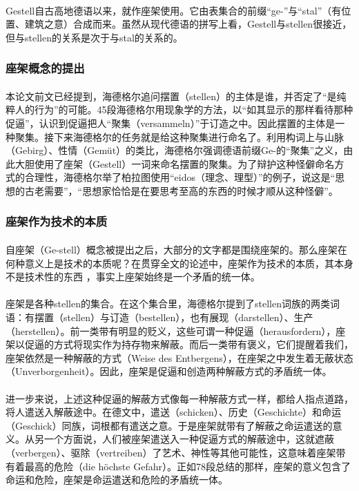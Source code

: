 \documentclass{article}
\begin{document}
		\paragraph{}
		Gestell自古高地德语以来，就作座架使用。它由表集合的前缀“ge-”与“stal”（有位置、建筑之意）合成而来。虽然从现代德语的拼写上看，Gestell与stellen很接近，但与stellen的关系是次于与stal的关系的。
		\subsubsection{座架概念的提出}
		\paragraph{}
		本论文前文已经提到，海德格尔追问摆置（stellen）的主体是谁，并否定了“是纯粹人的行为”的可能。45段海德格尔用现象学的方法，以“如其显示的那样看待那种促逼”，认识到促逼把人“聚集（versammeln）”于订造之中。因此摆置的主体是一种聚集。接下来海德格尔的任务就是给这种聚集进行命名了。利用构词上与山脉（Gebirg）、性情（Gemüt）的类比，海德格尔强调德语前缀Ge-的“聚集”之义\cite[pg. 937]{slct_Hei_Szx}，由此大胆使用了座架（Gestell）一词来命名摆置的聚集。为了辩护这种怪僻命名方式的合理性，海德格尔举了柏拉图使用“eidos（理念、理型）”的例子，说这是“思想的古老需要”，“思想家恰恰是在要思考至高的东西的时候才顺从这种怪僻”。
		\subsubsection{座架作为技术的本质}
		\paragraph{}
		自座架（Ge-stell）概念被提出之后，大部分的文字都是围绕座架的。那么座架在何种意义上是技术的本质呢？在贯穿全文的论述中，座架作为技术的本质，其本身不是技术性的东西 ，事实上座架始终是一个矛盾的统一体。
		\paragraph{}
		座架是各种stellen的集合。在这个集合里，海德格尔提到了stellen词族的两类词语：有摆置（stellen）与订造（bestellen），也有展现（darstellen）、生产（herstellen）。前一类带有明显的贬义，这些可谓一种促逼（herausfordern），座架以促逼的方式将现实作为持存物来解蔽。而后一类带有褒义，它们提醒着我们，座架依然是一种解蔽的方式（Weise des Entbergens），在座架之中发生着无蔽状态（Unverborgenheit）。因此，座架是促逼和创造两种解蔽方式的矛盾统一体。
		\paragraph{}
		进一步来说，上述这种促逼的解蔽方式像每一种解蔽方式一样，都给人指点道路，将人遣送入解蔽途中。在德文中，遣送（schicken）、历史（Geschichte）和命运（Geschick）同族，词根都有遣送之意。于是座架就带有了解蔽之命运遣送的意义。从另一个方面说，人们被座架遣送入一种促逼方式的解蔽途中，这就遮蔽（verbergen）、驱除（vertreiben）了艺术、神性等其他可能性，这意味着座架带有着最高的危险（die höchste Gefahr）。正如78段总结的那样，座架的意义包含了命运和危险，座架是命运遣送和危险的矛盾统一体。
\end{document}
